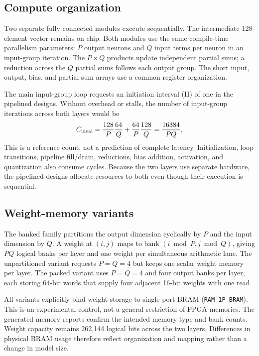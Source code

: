 \documentclass[11pt,letterpaper]{article}
\DeclareRobustCommand{\code}[1]{\nolinkurl{#1}}
\begin{document}
\subsection{Compute organization}
Two separate fully connected modules execute sequentially. The intermediate
128-element vector remains on chip. Both modules use the same compile-time
parallelism parameters: $P$ output neurons and $Q$ input terms per neuron in an
input-group iteration. The $P\times Q$ products update independent partial sums;
a reduction across the $Q$ partial sums follows each output group. The short
input, output, bias, and partial-sum arrays use a common register organization.

The main input-group loop requests an initiation interval (II) of one in the
pipelined designs. Without overhead or stalls, the number of input-group
iterations across both layers would be
\begin{equation}
 C_{\rm ideal}=\frac{128}{P}\frac{64}{Q}+
                \frac{64}{P}\frac{128}{Q}=\frac{16384}{PQ}.
\end{equation}
This is a reference count, not a prediction of complete latency. Initialization,
loop transitions, pipeline fill/drain, reductions, bias addition, activation,
and quantization also consume cycles. Because the two layers use separate
hardware, the pipelined designs allocate resources to both even though their
execution is sequential.

\subsection{Weight-memory variants}
The banked family partitions the output dimension cyclically by $P$ and the
input dimension by $Q$. A weight at $(i,j)$ maps to bank
$(i\bmod P,j\bmod Q)$, giving $PQ$ logical banks per layer and one weight per
simultaneous arithmetic lane. The unpartitioned variant requests $P=Q=4$ but
keeps one scalar weight memory per layer. The packed variant uses $P=Q=4$ and
four output banks per layer, each storing 64-bit words that supply four adjacent
16-bit weights with one read.

All variants explicitly bind weight storage to single-port BRAM
(\code{RAM_1P_BRAM}). This is an experimental control, not a general restriction
of FPGA memories. The generated memory reports confirm the intended memory
type and bank counts. Weight capacity remains 262,144 logical bits across the
two layers. Differences in physical BRAM usage therefore reflect organization
and mapping rather than a change in model size.
\end{document}

